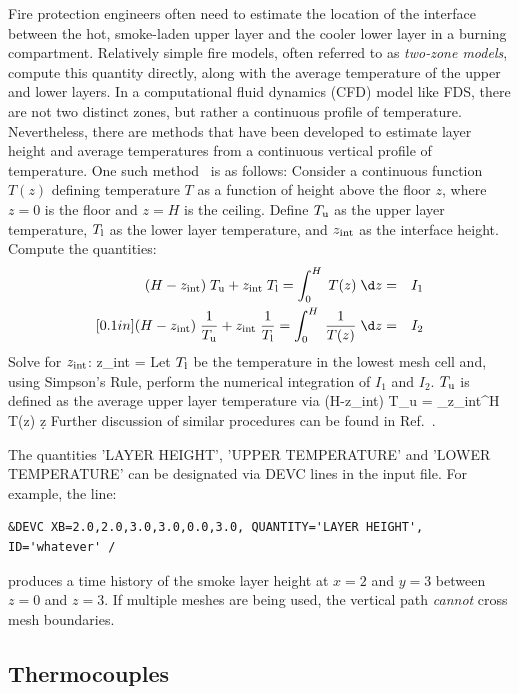 \documentclass[11pt]{book}
\begin{document}
Fire protection engineers often need to estimate the location of the
interface between the hot, smoke-laden upper layer and the cooler
lower layer in a burning compartment.  Relatively simple fire models,
often referred to as {\em two-zone models}, compute this quantity
directly, along with the average temperature of the upper and lower
layers.  In a computational fluid dynamics (CFD) model like FDS, there
are not two distinct zones, but rather a continuous profile of
temperature. Nevertheless, there are methods that have been developed
to estimate layer height and average temperatures from a continuous
vertical profile of temperature. One such
method~\cite{Janssens:JFS1992} is as follows: Consider a continuous
function $T(z)$ defining temperature $T$ as a function of height above
the floor $z$, where $z=0$ is the floor and $z=H$ is the
ceiling. Define $T_{\rm u}$ as the upper layer temperature, $T_{\rm l}$ as the
lower layer temperature, and $z_{\rm int}$ as the interface
height. Compute the quantities:
\begin{eqnarray*} (H-z_{\rm int})\; T_{\rm u} + z_{\rm int} \; T_{\rm l} = \int_0^H \; T(z) \; \d z &=& I_1 \\ [0.1in]
                  (H-z_{\rm int})\; \frac{1}{T_{\rm u}} + z_{\rm int} \; \frac{1}{T_{\rm l}} = \int_0^H \; \frac{1}{T(z)} \; \d z &=& I_2
\end{eqnarray*}
Solve for $z_{\rm int}$:
\be
   z_{\rm int} = 
\ee
Let $T_{\rm l}$ be the temperature in the lowest mesh cell and, using
Simpson's Rule, perform the numerical integration of $I_1$ and
$I_2$. $T_{\rm u}$ is defined as the average upper layer temperature via
\be
   (H-z_{\rm int})\; T_{\rm u} = \int_{z_{\rm int}}^H \; T(z) \; \d z
\ee
Further discussion of similar procedures can be found in Ref.~\cite{He:1}.

The quantities {\ct 'LAYER HEIGHT'}, {\ct 'UPPER TEMPERATURE'} and {\ct
'LOWER TEMPERATURE'} can be designated via {\ct DEVC} lines
in the input file. For example, the line:
\begin{lstlisting}
&DEVC XB=2.0,2.0,3.0,3.0,0.0,3.0, QUANTITY='LAYER HEIGHT', ID='whatever' /
\end{lstlisting}
produces a time history of the smoke layer height at $x=2$ and $y=3$ between $z=0$ and $z=3$.
If multiple meshes are being used, the vertical path {\em cannot} cross mesh boundaries.



\subsection{Thermocouples}
\label{info:THERMOCOUPLE}
\end{document}
